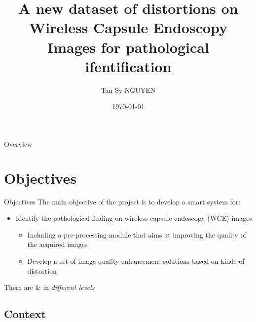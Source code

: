 \documentclass{libs/ufc_format}
\title[A new dataset of distortions on WCE images]{\textbf{A new dataset of distortions on Wireless Capsule Endoscopy Images for pathological ifentification}}
\author{Tan Sy NGUYEN}
\institute[- USPN]{
    \normalsize{\email{tansy.nguyen@math.univ-paris13.fr}}
    \newline
    \department{LAGA, L2TI}
    \newline
    \uspn
}
\date{\today}
\begin{document}


\begin{frame}{}
    \maketitle
\end{frame}

\begin{frame}{Overview}
    \tableofcontents
\end{frame}

\section{Objectives}
\begin{frame}{Objectives}
    The main objective of the project is to develop a smart system for:
    \begin{itemize}
        \item Identify the pathological finding on wireless capsule endoscopy (WCE) images
              \begin{itemize}
                  \item Including a pre-processing module that aims at improving the quality of the acquired images
                  \item Develop a set of image quality enhancement solutions based on kinds of distortion
              \end{itemize}


    \end{itemize}

    \vspace{0.2cm}

    There are  $\&$ in \emph{different levels}
\end{frame}

\subsection{Context}
\end{document}
